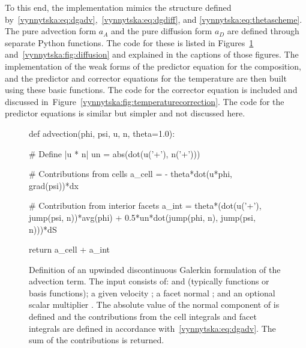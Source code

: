 To this end, the implementation mimics the structure defined
by~\eqref{vynnytska:eq:dgadv},~\eqref{vynnytska:eq:dgdiff}, and
\eqref{vynnytska:eq:thetascheme}. The pure advection form $a_A$ and
the pure diffusion form $a_D$ are defined through separate Python
functions. The code for these is listed in
Figures~\ref{vynnytska:fig:advection}
and~\ref{vynnytska:fig:diffusion} and explained in the captions of
those figures. The implementation of the weak forms of the predictor
equation for the composition, and the predictor and corrector
equations for the temperature are then built using these basic functions. The
code for the corrector equation is included and discussed
in~Figure~\ref{vynnytska:fig:temperaturecorrection}. The code for the
predictor equations is similar but simpler and not discussed
here.
\begin{figure}
  \begin{center}
    \begin{python}
def advection(phi, psi, u, n, theta=1.0):

    # Define |u * n|
    un = abs(dot(u('+'), n('+')))

    # Contributions from cells
    a_cell = - theta*dot(u*phi, grad(psi))*dx

    # Contribution from interior facets
    a_int = theta*(dot(u('+'), jump(psi, n))*avg(phi)
                   + 0.5*un*dot(jump(phi, n), jump(psi, n)))*dS

    return a_cell + a_int
    \end{python}
    \caption{Definition of an upwinded discontinuous Galerkin
      formulation of the advection term. The input consists of:
       and  (typically functions or basis
      functions); a given velocity ; a facet normal ;
      and an optional scalar multiplier . The absolute
      value of the normal component of  is defined and the
      contributions from the cell integrals and facet integrals are
      defined in accordance with~\eqref{vynnytska:eq:dgadv}. The sum
      of the contributions is returned.}
    \label{vynnytska:fig:advection}
  \end{center}
\end{figure}
